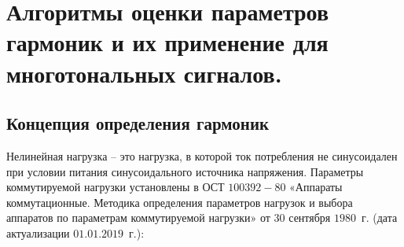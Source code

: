 
%




%
\chapter{ Алгоритмы оценки параметров гармоник и их применение для многотональных сигналов.}\label{ch:ch1}

\section{Концепция определения гармоник} \label{sec:ch1/sec1}

Нелинейная нагрузка – это нагрузка, в которой ток потребления не синусоидален при условии питания синусоидального источника напряжения.
Параметры коммутируемой нагрузки установлены в ОСТ $1 00392 - 80$  «Аппараты коммутационные. Методика определения параметров нагрузок и выбора аппаратов по параметрам коммутируемой нагрузки» от $30$   сентября $1980$~г. (дата актуализации  $01.01.2019$~г.):

